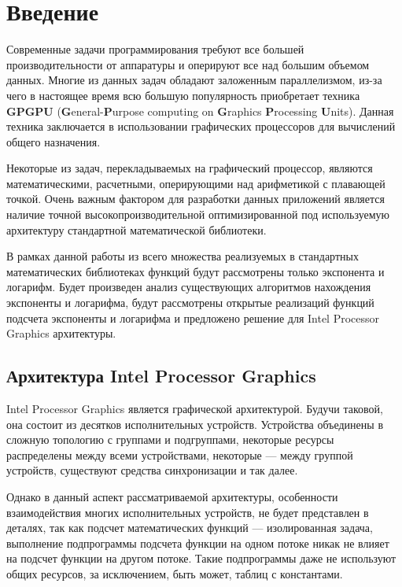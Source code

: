 \chapter{Введение}

Современные задачи программирования требуют все большей производительности от аппаратуры и
оперируют все над большим объемом данных. Многие из данных задач обладают заложенным параллелизмом,
из-за чего в настоящее время всю большую популярность приобретает техника \foreignlanguage{english}{\textbf{GPGPU}
(\textbf{G}eneral-\textbf{P}urpose computing on \textbf{G}raphics \textbf{P}rocessing \textbf{U}nits)}.
Данная техника заключается в использовании графических процессоров для вычислений общего назначения.

Некоторые из задач, перекладываемых на графический процессор, являются математическими, расчетными,
оперирующими над арифметикой с плавающей точкой. Очень важным фактором для разработки данных приложений
является наличие точной высокопроизводительной оптимизированной под используемую архитектуру
стандартной математической библиотеки.

В рамках данной работы из всего множества реализуемых в стандартных математических библиотеках
функций будут рассмотрены только экспонента и логарифм. Будет произведен анализ существующих
алгоритмов нахождения экспоненты и логарифма, будут рассмотрены открытые реализаций функций подсчета экспоненты и логарифма и предложено решение
для \foreignlanguage{english}{Intel Processor Graphics} архитектуры.


\section{Архитектура \foreignlanguage{english}{Intel Processor Graphics}}

\foreignlanguage{english}{Intel Processor Graphics} является графической архитектурой.
Будучи таковой, она состоит из десятков исполнительных устройств.
Устройства объединены в сложную топологию с группами и подгруппами, некоторые ресурсы распределены между всеми устройствами, некоторые --- между группой устройств, существуют средства синхронизации и так далее.

Однако в данный аспект рассматриваемой архитектуры, особенности взаимодействия многих исполнительных устройств, не будет представлен в деталях, так как подсчет математических функций --- изолированная задача, выполнение подпрограммы подсчета функции на одном потоке никак не влияет на подсчет функции на другом потоке.
Такие подпрограммы даже не используют общих ресурсов, за исключением, быть может, таблиц с константами.

